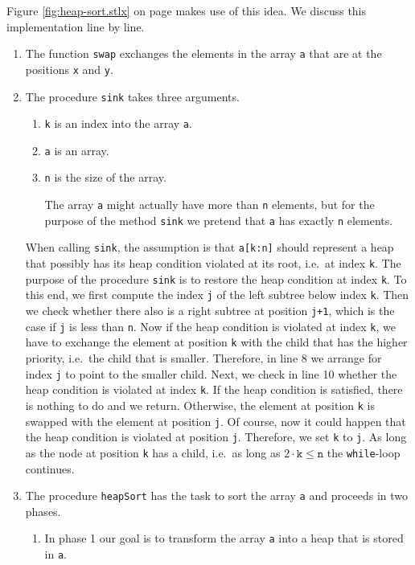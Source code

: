 Figure \ref{fig:heap-sort.stlx} on page \pageref{fig:basic-heapsort.stlx} makes use of this idea.
We discuss this implementation line by line.
\begin{enumerate}
\item The function \texttt{swap} exchanges the elements in the array \texttt{a} that are at the
      positions \texttt{x} and \texttt{y}.
\item The procedure \texttt{sink} takes three arguments.
      \begin{enumerate}
      \item \texttt{k} is an index into the array \texttt{a}.
      \item \texttt{a} is an array.
      \item \texttt{n} is the size of the array.  

            The array \texttt{a} might actually have more than \texttt{n} elements, but for the
            purpose of the method \texttt{sink} we pretend that \texttt{a} has exactly \texttt{n}
            elements. 
      \end{enumerate}
      When calling \texttt{sink}, the assumption is that \texttt{a[k:n]} should represent a heap 
      that possibly has its heap condition violated at its root, i.e.~at index \texttt{k}.  The
      purpose of the procedure \texttt{sink} is to restore the heap condition at index \texttt{k}.
      To this end, we first compute the index \texttt{j} of the left subtree below index \texttt{k}.
      Then we check whether there also is a right subtree at position \texttt{j+1}, which is the
      case if \texttt{j} is less than \texttt{n}.  Now if the heap condition is violated at index
      \texttt{k}, we have to exchange the element at  position \texttt{k} with the child that has
      the higher priority, i.e.~the child that is smaller. Therefore, in line 8 we arrange for index
      \texttt{j} to point to the smaller child.  Next, we check in line 10 whether the heap
      condition is violated at index \texttt{k}.  If the heap condition is satisfied, there is
      nothing to do and we return.  Otherwise, the element at position \texttt{k} is swapped with
      the element at position \texttt{j}.  Of course, now it could happen that the heap condition is
      violated at position \texttt{j}.  Therefore, we set \texttt{k} to \texttt{j}.
      As long as the node at position \texttt{k} has a child, i.e.~as long as 
      $2 \cdot \mathtt{k}\leq \mathtt{n}$ the \texttt{while}-loop continues.
\item The procedure \texttt{heapSort} has the task to sort the array \texttt{a} and proceeds in two phases.
      \begin{enumerate}
      \item In phase 1 our goal is to transform the array \texttt{a} into a heap that is stored in \texttt{a}.


\end{enumerate}
\end{enumerate}

